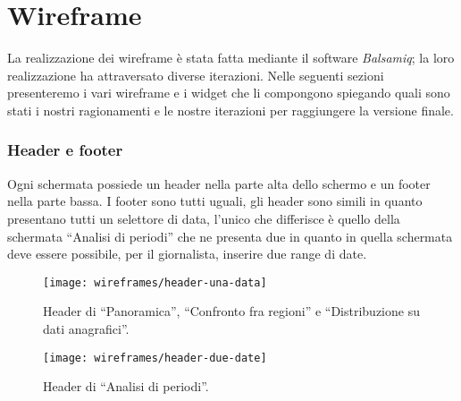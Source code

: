 \section{Wireframe}\label{s:wireframe}
La realizzazione dei wireframe è stata fatta mediante il software \textit{Balsamiq}; la loro realizzazione ha attraversato diverse iterazioni. Nelle seguenti sezioni presenteremo i vari wireframe e i widget che li compongono spiegando quali sono stati i nostri ragionamenti e le nostre iterazioni per raggiungere la versione finale.\\

\subsubsection{Header e footer}\label{ss:header-e-footer}
Ogni schermata possiede un header nella parte alta dello schermo e un footer nella parte bassa. I footer sono tutti uguali, gli header sono simili in quanto presentano tutti un selettore di data, l'unico che differisce è quello della schermata ``Analisi di periodi'' che ne presenta due in quanto in quella schermata deve essere possibile, per il giornalista, inserire due range di date.

\begin{figure}[H]
    \centering
    \texttt{[image: wireframes/header-una-data]}
    \caption{Header di ``Panoramica'', ``Confronto fra regioni'' e ``Distribuzione su dati anagrafici''.}\label{fig:header-una-data}
\end{figure}

\begin{figure}[H]
    \centering
    \texttt{[image: wireframes/header-due-date]}
    \caption{Header di ``Analisi di periodi''.}\label{fig:header-due-date}
\end{figure}

